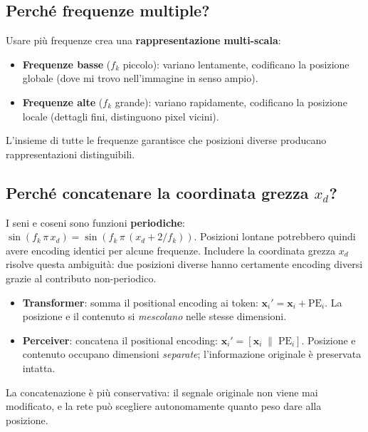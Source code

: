 \documentclass[
  11pt,
]{article}
\begin{document}
\subsection{Perché frequenze multiple?}

Usare più frequenze crea una \textbf{rappresentazione multi-scala}:
\begin{itemize}
  \item \textbf{Frequenze basse} ($f_k$ piccolo): variano lentamente, codificano la posizione globale (dove mi trovo nell'immagine in senso ampio).
  \item \textbf{Frequenze alte} ($f_k$ grande): variano rapidamente, codificano la posizione locale (dettagli fini, distinguono pixel vicini).
\end{itemize}
L'insieme di tutte le frequenze garantisce che posizioni diverse producano rappresentazioni distinguibili.

\subsection{Perché concatenare la coordinata grezza $x_d$?}

I seni e coseni sono funzioni \textbf{periodiche}: $\sin(f_k\,\pi\,x_d) = \sin(f_k\,\pi\,(x_d + 2/f_k))$. Posizioni lontane potrebbero quindi avere encoding identici per alcune frequenze. Includere la coordinata grezza $x_d$ risolve questa ambiguità: due posizioni diverse hanno certamente encoding diversi grazie al contributo non-periodico.

\begin{notabox}[title={\textbf{Perceiver (concatenazione) vs Transformer (somma)}}]
\begin{itemize}
  \item \textbf{Transformer}: somma il positional encoding ai token: $\mathbf{x}_i' = \mathbf{x}_i + \text{PE}_i$. La posizione e il contenuto si \emph{mescolano} nelle stesse dimensioni.
  \item \textbf{Perceiver}: concatena il positional encoding: $\mathbf{x}_i' = [\mathbf{x}_i \;\|\; \text{PE}_i]$. Posizione e contenuto occupano dimensioni \emph{separate}; l'informazione originale è preservata intatta.
\end{itemize}
La concatenazione è più conservativa: il segnale originale non viene mai modificato, e la rete può scegliere autonomamente quanto peso dare alla posizione.
\end{notabox}
\end{document}
